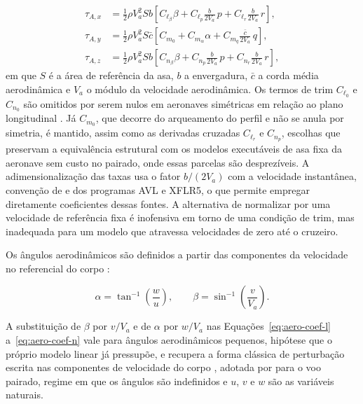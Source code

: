 {\begin{align}
  \tau_{A,x} &= \tfrac{1}{2}\rho V_a^2 S b \left[ C_{\ell_\beta}\beta + C_{\ell_p}\tfrac{b}{2V_a}\,p + C_{\ell_r}\tfrac{b}{2V_a}\,r \right],
  \label{eq:aero-coef-l} \\
  \tau_{A,y} &= \tfrac{1}{2}\rho V_a^2 S \bar{c} \left[ C_{m_0} + C_{m_\alpha}\alpha + C_{m_q}\tfrac{\bar{c}}{2V_a}\,q \right],
  \label{eq:aero-coef-m} \\
  \tau_{A,z} &= \tfrac{1}{2}\rho V_a^2 S b \left[ C_{n_\beta}\beta + C_{n_p}\tfrac{b}{2V_a}\,p + C_{n_r}\tfrac{b}{2V_a}\,r \right],
  \label{eq:aero-coef-n}
\end{align}
em que $S$ é a área de referência da asa, $b$ a envergadura, $\bar{c}$ a corda média aerodinâmica e $V_a$ o módulo da velocidade aerodinâmica. Os termos de trim $C_{\ell_0}$ e $C_{n_0}$ são omitidos por serem nulos em aeronaves simétricas em relação ao plano longitudinal \cite{Beard2012}. Já $C_{m_0}$, que decorre do arqueamento do perfil e não se anula por simetria, é mantido, assim como as derivadas cruzadas $C_{\ell_r}$ e $C_{n_p}$, escolhas que preservam a equivalência estrutural com os modelos executáveis de asa fixa da aeronave sem custo no pairado, onde essas parcelas são desprezíveis. A adimensionalização das taxas usa o fator $b/(2V_a)$ com a velocidade instantânea, convenção de \textcite{Beard2012} e dos programas AVL e XFLR5, o que permite empregar diretamente coeficientes dessas fontes. A alternativa de normalizar por uma velocidade de referência fixa \cite{Graesdal2021} é inofensiva em torno de uma condição de trim, mas inadequada para um modelo que atravessa velocidades de zero até o cruzeiro.

Os ângulos aerodinâmicos são definidos a partir das componentes da velocidade no referencial do corpo \cite[Eqs. 2.6 e 2.7]{Beard2012}:

\begin{equation}
  \alpha = \tan^{-1}\!\left(\frac{w}{u}\right), \qquad
  \beta  = \sin^{-1}\!\left(\frac{v}{V_a}\right).
  \label{eq:alpha-beta}
\end{equation}

A substituição de $\beta$ por $v/V_a$ e de $\alpha$ por $w/V_a$ nas Equações~\eqref{eq:aero-coef-l} a~\eqref{eq:aero-coef-n} vale para ângulos aerodinâmicos pequenos, hipótese que o próprio modelo linear já pressupõe, e recupera a forma clássica de perturbação escrita nas componentes de velocidade do corpo \cite{Graesdal2021}, adotada por \textcite{Nguyen2025} para o voo pairado, regime em que os ângulos são indefinidos e $u$, $v$ e $w$ são as variáveis naturais.

}
